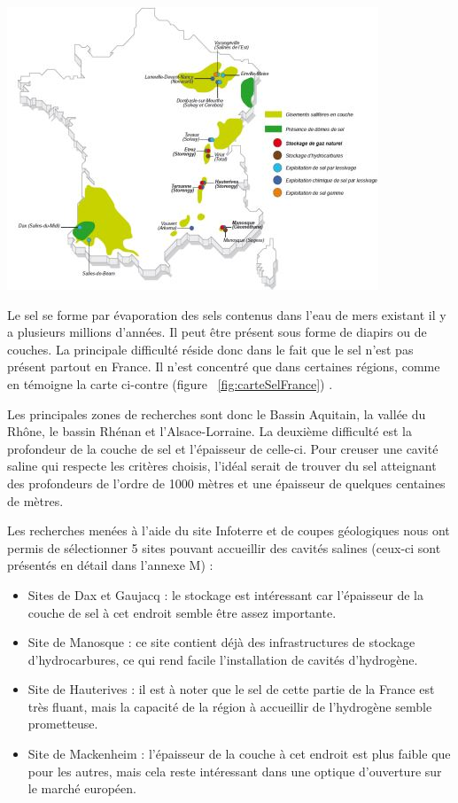 \documentclass[11pt,french,a4paper]{article}
\begin{document}
\begin{multicols}{2}

\begin{center}
\includegraphics[width=.85\linewidth]{image/chap4/IV.4.ii.jpg}
\label{fig:carteSelFrance}
\end{center}

Le sel se forme par évaporation des sels contenus dans l’eau de mers existant il y a plusieurs millions d’années. Il peut être présent sous forme de diapirs ou de couches.
La principale difficulté réside donc dans le fait que le sel n’est pas présent partout en France. Il n’est concentré que dans certaines régions, comme en témoigne la carte ci-contre (figure ~\ref{fig:carteSelFrance}) \cite{Hadj_Hassen_Jallais_2020}.

Les principales zones de recherches sont donc le Bassin Aquitain, la vallée du Rhône, le bassin Rhénan et l’Alsace-Lorraine. 
La deuxième difficulté est la profondeur de la couche de sel et l’épaisseur de celle-ci. Pour creuser une cavité saline qui respecte les critères choisis, l’idéal serait de trouver du sel atteignant des profondeurs de l’ordre de 1000 mètres et 
une épaisseur de quelques centaines de mètres.

Les recherches menées à l’aide du site Infoterre et de coupes géologiques nous ont permis de sélectionner 5 sites pouvant accueillir des cavités salines (ceux-ci sont présentés en détail dans l'annexe M) : 
\begin{itemize}
\item Sites de Dax et Gaujacq : le stockage est intéressant car l’épaisseur de la couche de sel à cet endroit semble être assez importante.
\item Site de Manosque : ce site contient déjà des infrastructures de stockage d’hydrocarbures, ce qui rend facile l’installation de cavités d’hydrogène.
\item Site de Hauterives : il est à noter que le sel de cette partie de la France est très fluant, mais la capacité de la région à accueillir de l’hydrogène semble prometteuse.
\item Site de Mackenheim : l’épaisseur de la couche à cet endroit est plus faible que pour les autres, mais cela reste intéressant dans une optique d’ouverture sur le marché européen.
\end{itemize}



\end{multicols}
\end{document}
